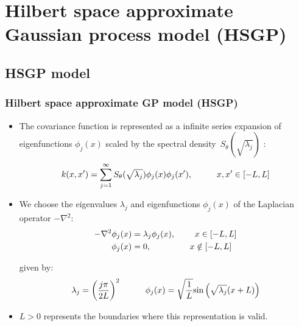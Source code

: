 \documentclass[8pt]{beamer} %
\begin{document}
\section[Hilbert space approximate GP model (HSGP)]{Hilbert space approximate Gaussian process model (HSGP)}

\subsection*{HSGP model}
\begin{frame}\frametitle{\normalsize Hilbert space approximate GP model (HSGP)}

\begin{itemize}\setlength\itemsep{2mm}

\item The covariance function is represented as a {\color{navyblue} infinite series expansion} of eigenfunctions $\phi_j(x)$ scaled by the spectral density\, $S_{\theta}(\sqrt{\lambda_j})$ {\color{darkgray} \citep{solin2018hilbert}}:
%
\begin{align*}
k(x,x') = \sum_{j=1}^\infty S_{\theta}(\sqrt{\lambda_j}) \phi_j(x) \phi_j(x'), \hspace{10mm} x,x' \in [-L,L]
\end{align*} 

\item We choose the {\color{navyblue} eigenvalues} $\lambda_j$ and {\color{navyblue} eigenfunctions} $\phi_j(x)$ of the Laplacian operator $-\nabla^2$:
%
\begin{align*}
-\nabla^2 \phi_j(x)&=\lambda_j \phi_j(x), \hspace{0.8cm}  x \in [-L,L] \\ 
\hspace{6mm}\phi_j(x)&=0, \hspace{1.6cm} x \notin [-L,L]
\end{align*}

given by:\\[-5mm]
%
\begin{gather*}
\lambda_j=\left(\frac{j\pi}{2L}\right)^2 \hspace{10mm}
\phi_j(x)=\sqrt{\frac{1}{L}} \text{sin}\left(\sqrt{\lambda_j}(x+L)\right)
\end{gather*}

\item $L > 0$ represents the {\color{navyblue} boundaries} where this representation is valid.
\end{itemize}
\end{frame}
\end{document}
